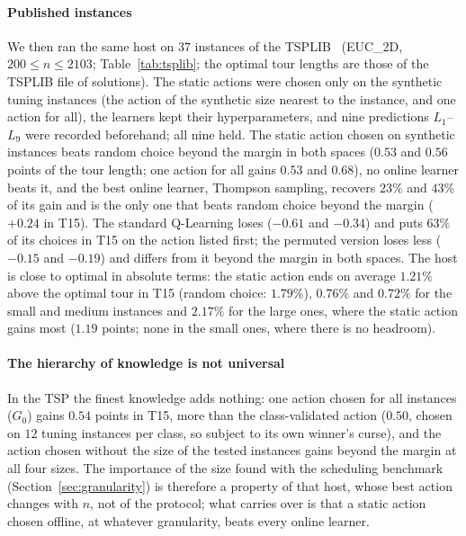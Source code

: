 \paragraph{Published instances} We then ran the same host on $37$ instances of the TSPLIB~\cite{Reinelt1991} (EUC\_2D, $200\le n\le2103$; Table~\ref{tab:tsplib}; the optimal tour lengths are those of the TSPLIB file of solutions). The static actions were chosen only on the synthetic tuning instances (the action of the synthetic size nearest to the instance, and one action for all), the learners kept their hyperparameters, and nine predictions $L_1$--$L_9$ were recorded beforehand; all nine held. The static action chosen on synthetic instances beats random choice beyond the margin in both spaces ($0.53$ and $0.56$ points of the tour length; one action for all gains $0.53$ and $0.68$), no online learner beats it, and the best online learner, Thompson sampling, recovers $23\%$ and $43\%$ of its gain and is the only one that beats random choice beyond the margin ($+0.24$ in T15). The standard Q-Learning loses ($-0.61$ and $-0.34$) and puts $63\%$ of its choices in T15 on the action listed first; the permuted version loses less ($-0.15$ and $-0.19$) and differs from it beyond the margin in both spaces. The host is close to optimal in absolute terms: the static action ends on average $1.21\%$ above the optimal tour in T15 (random choice: $1.79\%$), $0.76\%$ and $0.72\%$ for the small and medium instances and $2.17\%$ for the large ones, where the static action gains most ($1.19$ points; none in the small ones, where there is no headroom).

\paragraph{The hierarchy of knowledge is not universal} In the TSP the finest knowledge adds nothing: one action chosen for all instances ($G_0$) gains $0.54$ points in T15, more than the class-validated action ($0.50$, chosen on $12$ tuning instances per class, so subject to its own winner's curse), and the action chosen without the size of the tested instances gains beyond the margin at all four sizes. The importance of the size found with the scheduling benchmark (Section~\ref{sec:granularity}) is therefore a property of that host, whose best action changes with $n$, not of the protocol; what carries over is that a static action chosen offline, at whatever granularity, beats every online learner.

